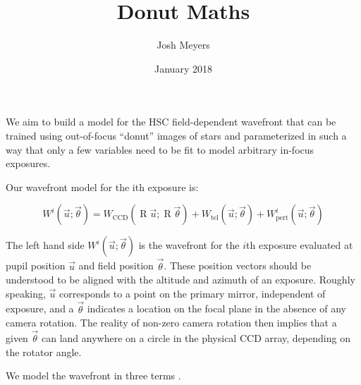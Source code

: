 \documentclass{article}
\title{Donut Maths}
\author{Josh Meyers}
\date{January 2018}
\DeclareMathOperator{\R}{R}
\begin{document}
We aim to build a model for the HSC field-dependent wavefront that can be trained using out-of-focus
``donut'' images of stars and parameterized in such a way that only a few variables need to be fit
to model arbitrary in-focus exposures.

Our wavefront model for the ith exposure is:

\begin{equation}
    W^i\left(\vec{u}; \vec{\theta}\right) = W_\mathrm{CCD}\left(\R \vec{u}; \R \vec{\theta}\right) + W_\mathrm{tel}\left(\vec{u}; \vec{\theta}\right) + W_\mathrm{pert}^i\left(\vec{u}; \vec{\theta}\right)
\end{equation}

The left hand side $W^i\left(\vec{u}; \vec{\theta}\right)$ is the wavefront for the $i$th exposure
evaluated at pupil position $\vec{u}$ and field position $\vec{\theta}$.  These position vectors
should be understood to be aligned with the altitude and azimuth of an exposure.  Roughly speaking,
$\vec{u}$ corresponds to a point on the primary mirror, independent of exposure, and a
$\vec{\theta}$ indicates a location on the focal plane in the absence of any camera rotation.  The
reality of non-zero camera rotation then implies that a given $\vec{\theta}$ can land anywhere on a
circle in the physical CCD array, depending on the rotator angle.

We model the wavefront in three terms .
\end{document}
